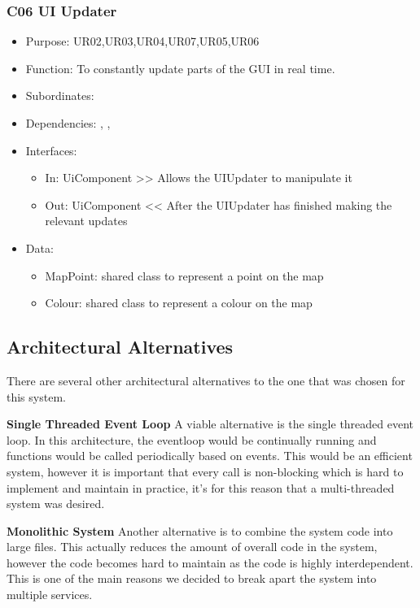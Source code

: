 \subsubsection{C06 UI Updater} \label{compUIUpdater}
\begin{itemize}
	\item Purpose: UR02,UR03,UR04,UR07,UR05,UR06
	\item Function: To constantly update parts of the GUI in real time. 
	\item Subordinates:
	\item Dependencies: , , 
	\item Interfaces:
	\begin{itemize}
		\item In: UiComponent >> Allows the UIUpdater to manipulate it
		\item Out: UiComponent << After the UIUpdater has finished making the relevant updates
	\end{itemize}
	\item Data:
	\begin{itemize}
		\item MapPoint: shared class to represent a point on the map
		\item Colour: shared class to represent a colour on the map
	\end{itemize}
\end{itemize}

\subsection{Architectural Alternatives}
There are several other architectural alternatives to the one that was chosen for this system. 

\textbf{Single Threaded Event Loop}
A viable alternative is the single threaded event loop. In this architecture, the eventloop would be continually running and functions would be called periodically based on events. This would be an efficient system, however it is important that every call is non-blocking which is hard to implement and maintain in practice, it's for this reason that a multi-threaded system was desired.

\textbf{Monolithic System}
Another alternative is to combine the system code into large files. This actually reduces the amount of overall code in the system, however the code becomes hard to maintain as the code is highly interdependent. This is one of the main reasons we decided to break apart the system into multiple services.

